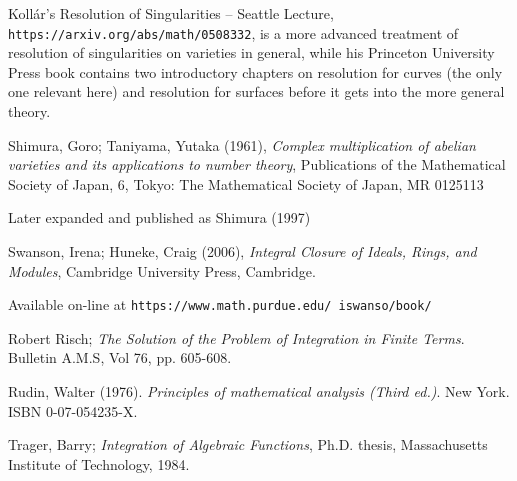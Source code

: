 \begin{thebibliography}{9}
Kollár's Resolution of Singularities -- Seattle Lecture, {\tt https://arxiv.org/abs/math/0508332},
is a more advanced treatment of resolution of singularities on varieties in general, while
his Princeton University Press book contains two introductory chapters on resolution for curves
(the only one relevant here) and resolution for surfaces before it gets into the more general theory.

Shimura, Goro; Taniyama, Yutaka (1961), {\it Complex multiplication of abelian varieties and its applications to number theory},
Publications of the Mathematical Society of Japan, 6, Tokyo: The Mathematical Society of Japan, MR 0125113

Later expanded and published as Shimura (1997)

Swanson, Irena; Huneke, Craig (2006), {\it Integral Closure of Ideals, Rings, and Modules},
Cambridge University Press, Cambridge.

Available on-line at {\tt https://www.math.purdue.edu/~iswanso/book/}

Robert Risch; {\it The Solution of the Problem of Integration in Finite Terms}.  Bulletin A.M.S, Vol 76, pp. 605-608.

Rudin, Walter (1976). {\it Principles of mathematical analysis (Third ed.)}. New York. ISBN 0-07-054235-X.

Trager, Barry; {\it Integration of Algebraic Functions}, Ph.D. thesis, Massachusetts Institute of Technology, 1984.


\end{thebibliography}

